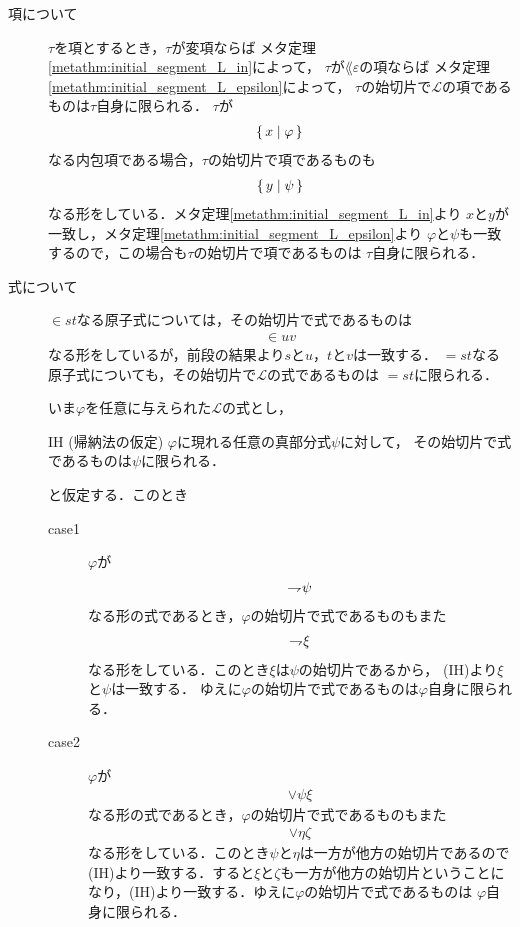 	\begin{metaprf}\mbox{}
		\begin{description}
			\item[項について]
				$\tau$を項とするとき，$\tau$が変項ならば
				メタ定理\ref{metathm:initial_segment_L_in}によって，
				$\tau$が$\lang{\varepsilon}$の項ならば
				メタ定理\ref{metathm:initial_segment_L_epsilon}によって，
				$\tau$の始切片で$\mathcal{L}$の項であるものは$\tau$自身に限られる．
				$\tau$が
				\begin{align}
					\{\, x \mid \varphi\, \}
				\end{align}
				なる内包項である場合，$\tau$の始切片で項であるものも
				\begin{align}
					\{\, y \mid \psi\, \}
				\end{align}
				なる形をしている．メタ定理\ref{metathm:initial_segment_L_in}より
				$x$と$y$が一致し，メタ定理\ref{metathm:initial_segment_L_epsilon}より
				$\varphi$と$\psi$も一致するので，この場合も$\tau$の始切片で項であるものは
				$\tau$自身に限られる．
				
			\item[式について]
				$\in st$なる原子式については，その始切片で式であるものは
				\begin{align}
					\in uv
				\end{align}
				なる形をしているが，前段の結果より$s$と$u$，$t$と$v$は一致する．
				$=st$なる原子式についても，その始切片で$\mathcal{L}$の式であるものは
				$=st$に限られる．
				
				いま$\varphi$を任意に与えられた$\mathcal{L}$の式とし，
				\begin{itembox}[l]{IH (帰納法の仮定)}
					$\varphi$に現れる任意の真部分式$\psi$に対して，
					その始切片で式であるものは$\psi$に限られる．
				\end{itembox}
				と仮定する．このとき
				\begin{description}
					\item[case1] $\varphi$が
						\begin{align}
							\rightharpoondown\hspace{-0.25em} \psi
						\end{align}
						なる形の式であるとき，$\varphi$の始切片で式であるものもまた
						\begin{align}
							\rightharpoondown\hspace{-0.25em} \xi
						\end{align}
						なる形をしている．このとき$\xi$は$\psi$の始切片であるから，
						(IH)より$\xi$と$\psi$は一致する．
						ゆえに$\varphi$の始切片で式であるものは$\varphi$自身に限られる．
			
					\item[case2] $\varphi$が
						\begin{align}
							\vee \psi \xi
						\end{align}
						なる形の式であるとき，$\varphi$の始切片で式であるものもまた
						\begin{align}
							\vee \eta \zeta
						\end{align}
						なる形をしている．このとき$\psi$と$\eta$は一方が他方の始切片であるので
						(IH)より一致する．すると$\xi$と$\zeta$も一方が他方の始切片ということに
						なり，(IH)より一致する．ゆえに$\varphi$の始切片で式であるものは
						$\varphi$自身に限られる．
						

\end{description}
\end{description}
\end{metaprf}
